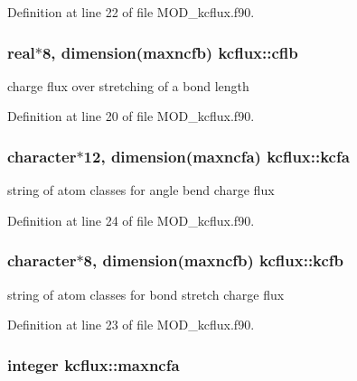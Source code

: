 Definition at line 22 of file M\-O\-D\-\_\-kcflux.\-f90.

\hypertarget{classkcflux_a4d5f1952541c88e9d14138a352e4ae77}{
\subsubsection[{cflb}]{\setlength{\rightskip}{0pt plus 5cm}real$\ast$8, dimension({\bf maxncfb}) kcflux\-::cflb}}\label{classkcflux_a4d5f1952541c88e9d14138a352e4ae77}


charge flux over stretching of a bond length 



Definition at line 20 of file M\-O\-D\-\_\-kcflux.\-f90.

\hypertarget{classkcflux_ae44315660c09ff5741e75037d0a29ee1}{
\subsubsection[{kcfa}]{\setlength{\rightskip}{0pt plus 5cm}character$\ast$12, dimension({\bf maxncfa}) kcflux\-::kcfa}}\label{classkcflux_ae44315660c09ff5741e75037d0a29ee1}


string of atom classes for angle bend charge flux 



Definition at line 24 of file M\-O\-D\-\_\-kcflux.\-f90.

\hypertarget{classkcflux_aaa22ec05a2e498ed74e13845c7f1fef7}{
\subsubsection[{kcfb}]{\setlength{\rightskip}{0pt plus 5cm}character$\ast$8, dimension({\bf maxncfb}) kcflux\-::kcfb}}\label{classkcflux_aaa22ec05a2e498ed74e13845c7f1fef7}


string of atom classes for bond stretch charge flux 



Definition at line 23 of file M\-O\-D\-\_\-kcflux.\-f90.

\hypertarget{classkcflux_aed5026e7c442e2d8adc07418913e4b23}{
\subsubsection[{maxncfa}]{\setlength{\rightskip}{0pt plus 5cm}integer kcflux\-::maxncfa}}\label{classkcflux_aed5026e7c442e2d8adc07418913e4b23}


